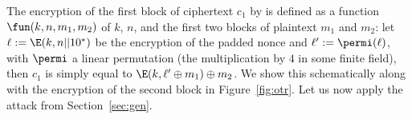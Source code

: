 The encryption of the first block of ciphertext $c_1$ by \proestotr is defined as a function
$\fun(k, n, m_1, m_2)$
of $k$, $n$, and the first two blocks of plaintext $m_1$ and $m_2$:
let $\ell := \E(k, n || 10^*)$ be the encryption of the padded nonce and
$\ell' := \permi(\ell)$, with $\permi$ a linear permutation (the multiplication by $4$ in some finite field),
then $c_1$ is simply equal to $\E(k, \ell' \oplus m_1) \oplus m_2$. We show this schematically along with the encryption
of the second block in Figure~\ref{fig:otr}.
Let us now apply the attack from Section~\ref{sec:gen}.

\begin{figure}[ht]
\begin{center}
\end{center}
\end{figure}

